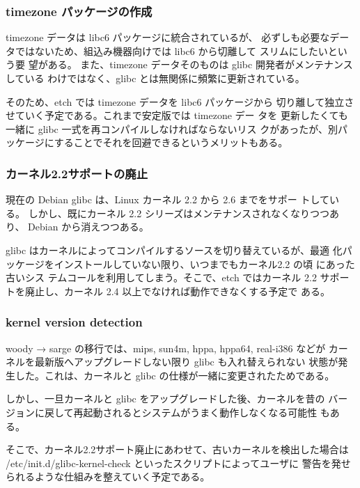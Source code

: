 \documentclass[mingoth]{jsarticle}
\begin{document}
  \subsubsection{timezone パッケージの作成}

    timezone データは libc6 パッケージに統合されているが、
    必ずしも必要なデータではないため、組込み機器向けでは libc6 から切離して
    スリムにしたいという要
    望がある。
    また、timezone データそのものは glibc 開発者がメンテナンスしている
    わけではなく、glibc とは無関係に頻繁に更新されている。

    そのため、etch では timezone データを libc6 パッケージから
    切り離して独立させていく予定である。これまで安定版では timezone デー
    タを
    更新したくても一緒に glibc 一式を再コンパイルしなければならないリス
    クがあったが、別パッケージにすることでそれを回避できるというメリットもある。

  \subsubsection{カーネル2.2サポートの廃止}

    現在の Debian glibc は、Linux カーネル 2.2 から 2.6 までをサポー
    トしている。
    しかし、既にカーネル 2.2 シリーズはメンテナンスされなくなりつつあり、
    Debian から消えつつある。

    glibc はカーネルによってコンパイルするソースを切り替えているが、最適
    化パッケージをインストールしていない限り、いつまでもカーネル2.2 の頃
    にあった古いシス
    テムコールを利用してしまう。そこで、etch ではカーネル 2.2 
    サポートを廃止し、カーネル 2.4 以上でなければ動作できなくする予定で
    ある。

  \subsubsection{kernel version detection}

    woody → sarge の移行では、mips, sun4m, hppa, hppa64, real-i386 などが
    カーネルを最新版へアップグレードしない限り glibc も入れ替えられない
    状態が発生した。これは、カーネルと glibc の仕様が一緒に変更されたためである。

    しかし、一旦カーネルと glibc をアップグレードした後、カーネルを昔の
    バージョンに戻して再起動されるとシステムがうまく動作しなくなる可能性
    もある。

    そこで、カーネル2.2サポート廃止にあわせて、古いカーネルを検出した場合は 
    /etc/init.d/glibc-kernel-check といったスクリプトによってユーザに
    警告を発せられるような仕組みを整えていく予定である。
\end{document}
